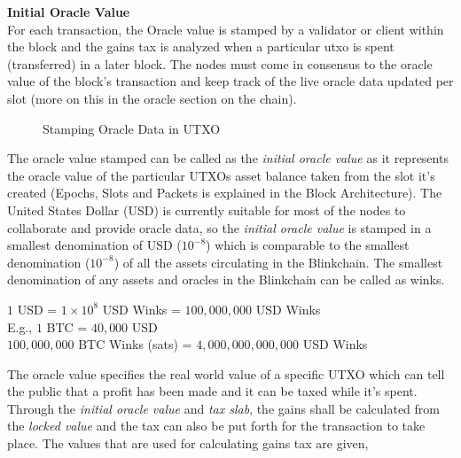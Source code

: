 \documentclass[letterpaper,11pt]{article}
\begin{document}
\textbf{Initial Oracle Value}\\


For each transaction, the Oracle value is stamped by a validator or client within the block and the gains tax is analyzed when a particular utxo is spent (transferred) in a later block. The nodes must come in consensus to the oracle value of the block's transaction and keep track of the live oracle data updated per slot (more on this in the  oracle section on the chain).\\


\begin{figure}
\caption{Stamping Oracle Data in UTXO}
\end{figure} 

The oracle value stamped can be called as the \textit{initial oracle value} as it represents the oracle value of the particular UTXOs asset balance taken from the slot it's created (Epochs, Slots and Packets is explained in the Block Architecture). The United States Dollar (USD) is currently suitable for most of the nodes to collaborate and provide oracle data, so the \textit{initial oracle value} is stamped in a smallest denomination of USD ($10^{-8}$) which is comparable to the smallest denomination ($10^{-8}$) of all the assets circulating in the Blinkchain. The smallest denomination of any assets and oracles in the Blinkchain can be called as winks.\\

\begin{center}
$1$ USD = $1 \times 10^{8}$ USD Winks = $100,000,000$ USD Winks\\
\vspace{2mm}
E.g., $1$ BTC = $40,000$ USD\\
$100,000,000$ BTC Winks (sats) = $4,000,000,000,000$ USD Winks
\end{center}

The oracle value specifies the real world value of a specific UTXO which can tell the public that a profit has been made and it can be taxed while it's spent. Through the \textit{initial oracle value} and \textit{tax slab}, the gains shall be calculated from the \textit{locked value} and the tax can also be put forth for the transaction to take place. The values that are used for calculating gains tax are given,\\
\end{document}
